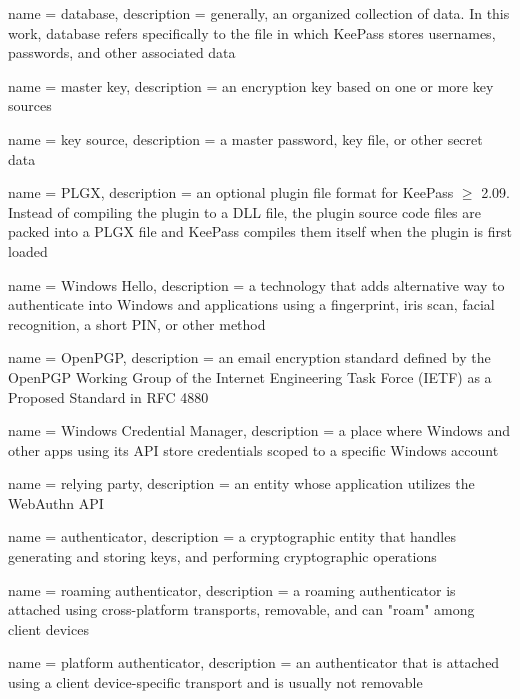 {
	name = database,
	description = {generally, an organized collection of data. In this work, database refers specifically to the file in which KeePass stores usernames, passwords, and other associated data}
}

{
	name = master key,
	description = {an encryption key based on one or more key sources}
}

{
	name = key source,
	description = {a master password, key file, or other secret data}
}

{
	name = PLGX,
	description = {an optional plugin file format for KeePass $\geq$ 2.09. Instead of compiling the plugin to a DLL file, the plugin source code files are packed into a PLGX file and KeePass compiles them itself when the plugin is first loaded~\cite{keepass:plugin-development}}
}

{
	name = Windows Hello,
	description = {a technology that adds alternative way to authenticate into Windows and applications using a fingerprint, iris scan, facial recognition, a short PIN, or other method}
}

{
	name = OpenPGP,
	description = {an email encryption standard defined by the OpenPGP Working Group of the Internet Engineering Task Force (IETF) as a Proposed Standard in RFC 4880}
}

{
	name = Windows Credential Manager,
	description = {a place where Windows and other apps using its API store credentials scoped to a specific Windows account}
}

{
	name = relying party,
	description = {an entity whose application utilizes the WebAuthn API}
}

{
	name = authenticator,
	description = {a cryptographic entity that handles generating and storing keys, and performing cryptographic operations}
}

{
	name = roaming authenticator,
	description = {a roaming authenticator is attached using cross-platform transports, removable, and can "roam" among client devices}
}

{
	name = platform authenticator,
	description = {an authenticator that is attached using a client device-specific transport and is usually not removable}
}

